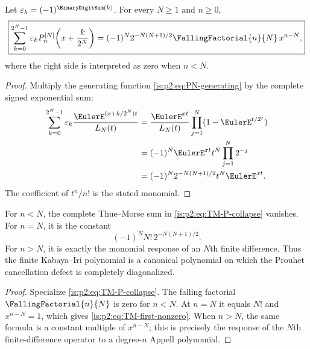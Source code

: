 \begin{theorem}
\label{is:p2:thm:TM-uncentered}
Let $\eps_k=(-1)^{\BinaryDigitSum(k)}$.  For every $N\ge1$ and $n\ge0$,
\begin{equation}
 \boxed{
 \sum_{k=0}^{2^N-1}\eps_k
 P_n^{[N]}\!\left(x+\frac{k}{2^N}\right)
 =(-1)^N2^{-N(N+1)/2}\FallingFactorial{n}{N}\,x^{n-N},
 }
 \label{is:p2:eq:TM-P-collapse}
\end{equation}
where the right side is interpreted as zero when $n<N$.
\end{theorem}

\begin{proof}
Multiply the generating function \eqref{is:p2:eq:PN-generating} by the complete signed exponential sum:
\begin{align*}
 \sum_{k=0}^{2^N-1}\eps_k
 \frac{\EulerE^{(x+k/2^N)t}}{L_N(t)}
 &=\frac{\EulerE^{xt}}{L_N(t)}
   \prod_{j=1}^{N}(1-\EulerE^{t/2^j})\\
 &=(-1)^N\EulerE^{xt}t^N\prod_{j=1}^{N}2^{-j}\\
 &=(-1)^N2^{-N(N+1)/2}t^N\EulerE^{xt}.
\end{align*}
The coefficient of $t^n/n!$ is the stated monomial.
\end{proof}

\begin{corollary}
\label{is:p2:cor:Prouhet-canonical}
For $n<N$, the complete Thue--Morse sum in \eqref{is:p2:eq:TM-P-collapse} vanishes.  For $n=N$, it is the
constant
\begin{equation}
 (-1)^NN!\,2^{-N(N+1)/2}.
 \label{is:p2:eq:TM-first-nonzero}
\end{equation}
For $n>N$, it is exactly the monomial response of an $N$th finite difference.  Thus the finite
Kabaya--Iri polynomial is a canonical polynomial on which the Prouhet cancellation defect is
completely diagonalized.
\end{corollary}

\begin{proof}
Specialize \eqref{is:p2:eq:TM-P-collapse}.  The falling factorial
$\FallingFactorial{n}{N}$ is zero for $n<N$.  At $n=N$ it equals $N!$ and $x^{n-N}=1$,
which gives \eqref{is:p2:eq:TM-first-nonzero}.  When $n>N$, the same formula
is a constant multiple of $x^{n-N}$; this is precisely the response of the
$N$th finite-difference operator to a degree-$n$ Appell polynomial.
\end{proof}

